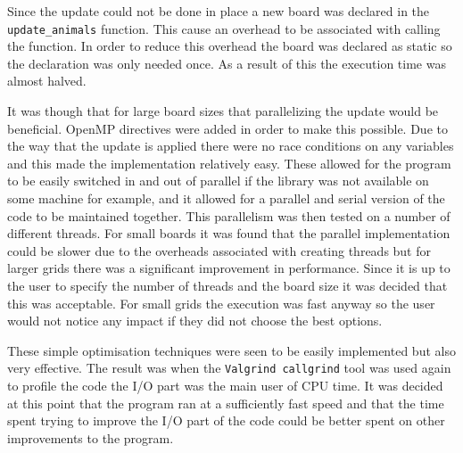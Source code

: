 Since the update could not be done in place a new board was declared in the \texttt{update\_animals} function.
This cause an overhead to be associated with calling the function.
In order to reduce this overhead the board was declared as static so the declaration was only needed once.
As a result of this the execution time was almost halved.

It was though that for large board sizes that parallelizing the update would be beneficial.
OpenMP directives were added in order to make this possible.
Due to the way that the update is applied there were no race conditions on any variables and this made the implementation relatively easy.
These allowed for the program to be easily switched in and out of parallel if the library was not available on some machine for example, and it allowed for a parallel and serial version of the code to be maintained together.
This parallelism was then tested on a number of different threads.
For small boards it was found that the parallel implementation could be slower due to the overheads associated with creating threads but for larger grids there was a significant improvement in performance.
Since it is up to the user to specify the number of threads and the board size it was decided that this was acceptable.
For small grids the execution was fast anyway so the user would not notice any impact if they did not choose the best options.

These simple optimisation techniques were seen to be easily implemented but also very effective.
The result was when the \texttt{Valgrind callgrind} tool was used again to profile the code the I/O part was the main user of CPU time.
It was decided at this point that the program ran at a sufficiently fast speed and that the time spent trying to improve the I/O part of the code could be better spent on other improvements to the program.
